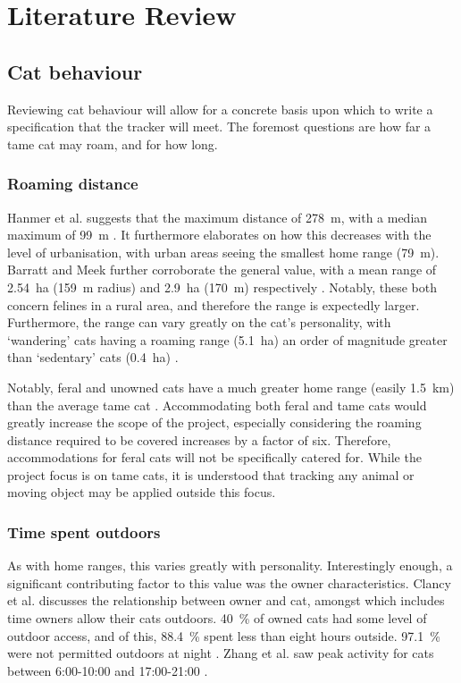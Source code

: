 \section{Literature Review}
\label{sec:litrev}

\subsection{Cat behaviour}

Reviewing cat behaviour will allow for a concrete basis upon which to write a specification 
that the tracker will meet. The foremost questions are how far a tame cat may roam, and for how long.

\subsubsection{Roaming distance}
\label{sec:roam}
Hanmer et al. suggests that the maximum distance of \qty{278}{\m}, 
with a median maximum of \qty{99}{\m} \cite{hanmer:urbanisaton}.
It furthermore elaborates on how this decreases with the level of urbanisation, with urban 
areas seeing the smallest home range (\qty{79}{\m}). 
Barratt and Meek further corroborate the 
general value, with a mean range of \qty{2.54}{\hectare} (\qty{159}{\m} radius) and \qty{2.9}{\hectare} (\qty{170}{\m})
respectively \cite{barratt:home, meek:home}. Notably, these both concern felines in a rural area, 
and therefore the range is expectedly larger. Furthermore, the range can vary greatly on the 
cat's personality, with `wandering' cats having a roaming range (\qty{5.1}{\hectare}) an order of magnitude greater than `sedentary'
cats (\qty{0.4}{\hectare}) \cite{meek:home}. 

Notably, feral and unowned cats have a much greater home range (easily \qty{1.5}{\km}) than the 
average tame cat \cite{bengsen:feral,horn:range,molsher2005home}.
Accommodating both feral and tame cats would greatly increase the scope of the project,
especially considering the roaming distance required to be covered increases by a factor 
of six. Therefore, accommodations for feral cats will not be specifically catered for. 
While the project focus is on tame cats, it is understood that tracking any animal 
or moving object may be applied outside this focus. 

\subsubsection{Time spent outdoors}
As with home ranges, this varies greatly with personality. Interestingly enough, a significant 
contributing factor to this value was the owner characteristics. Clancy et al. discusses the 
relationship between owner and cat, amongst which includes time owners allow their cats outdoors.
\qty{40}{\%} of owned cats had some level of outdoor access, and of this, \qty{88.4}{\%} 
spent less than eight hours outside. \qty{97.1}{\%} were not permitted outdoors at night \cite{clancy2003}.
Zhang et al. saw peak activity for cats between 6:00-10:00 and 17:00-21:00 \cite{zhang2022}. 

